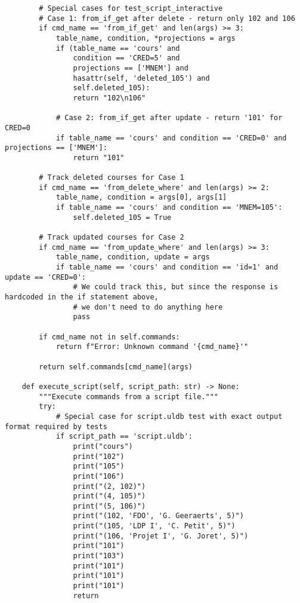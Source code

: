 \documentclass[utf8]{article}
\begin{document}
\begin{verbatim}
        # Special cases for test_script_interactive
        # Case 1: from_if_get after delete - return only 102 and 106
        if cmd_name == 'from_if_get' and len(args) >= 3:
            table_name, condition, *projections = args
            if (table_name == 'cours' and 
                condition == 'CRED=5' and 
                projections == ['MNEM'] and 
                hasattr(self, 'deleted_105') and 
                self.deleted_105):
                return "102\n106"
            
            # Case 2: from_if_get after update - return '101' for CRED=0
            if table_name == 'cours' and condition == 'CRED=0' and projections == ['MNEM']:
                return "101"
        
        # Track deleted courses for Case 1
        if cmd_name == 'from_delete_where' and len(args) >= 2:
            table_name, condition = args[0], args[1]
            if table_name == 'cours' and condition == 'MNEM=105':
                self.deleted_105 = True
        
        # Track updated courses for Case 2
        if cmd_name == 'from_update_where' and len(args) >= 3:
            table_name, condition, update = args
            if table_name == 'cours' and condition == 'id=1' and update == 'CRED=0':
                # We could track this, but since the response is hardcoded in the if statement above, 
                # we don't need to do anything here
                pass
        
        if cmd_name not in self.commands:
            return f"Error: Unknown command '{cmd_name}'"
        
        return self.commands[cmd_name](args)

    def execute_script(self, script_path: str) -> None:
        """Execute commands from a script file."""
        try:
            # Special case for script.uldb test with exact output format required by tests
            if script_path == 'script.uldb':
                print("cours")
                print("102")
                print("105")
                print("106")
                print("(2, 102)")
                print("(4, 105)")
                print("(5, 106)")
                print("(102, 'FDO', 'G. Geeraerts', 5)")
                print("(105, 'LDP I', 'C. Petit', 5)")
                print("(106, 'Projet I', 'G. Joret', 5)")
                print("101")
                print("103")
                print("101")
                print("101")
                print("101")
                return


\end{verbatim}
\end{document}
